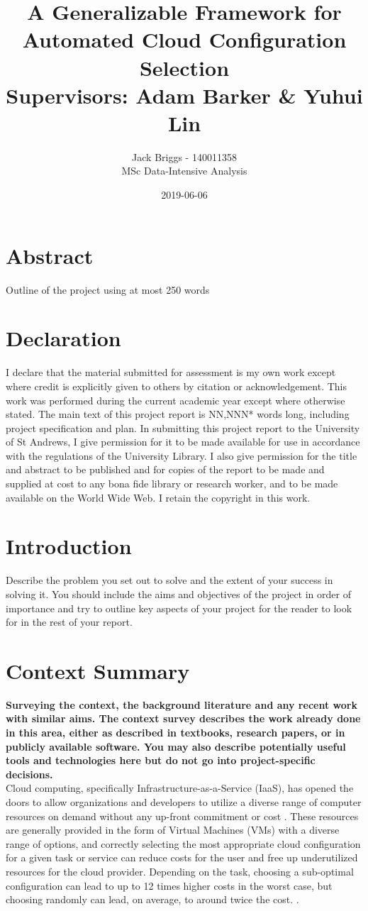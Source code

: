 \documentclass{article}
\title{\vspace{-2.0cm} A Generalizable Framework for Automated Cloud Configuration Selection \\ \vspace{0.5cm} \large Supervisors: Adam Barker \& Yuhui Lin}
\date{2019-06-06}
\author{Jack Briggs - 140011358 \\ MSc Data-Intensive Analysis}
\begin{document}
\maketitle
\newpage
\section*{Abstract}
Outline of the project using at most 250 words
\newpage
\section*{Declaration}
I declare that the material submitted for assessment
is my own work except where credit is explicitly
given to others by citation or acknowledgement. This
work was performed during the current academic year
except where otherwise stated.
The main text of this project report is NN,NNN* words
long, including project specification and plan.
In submitting this project report to the University of St
Andrews, I give permission for it to be made
available for use in accordance with the regulations of the University Library. I also give permission for the title and abstract to be published and for copies of the report to be made and supplied at cost to any bona fide library or research worker, and to be made available on the World Wide Web. I retain the copyright in this work.
\newpage
\tableofcontents
\listoffigures
\newpage
\section{Introduction}
Describe the problem you set out to solve and the extent
of your success in solving it. You should include the aims
and objectives of the project in order of importance and
try to outline key aspects of your project for the reader to look for in the rest of your report.
\section{Context Summary}
\textbf{Surveying the context, the background literature and any
recent work with similar aims. The context survey
describes the work already done in this area, either as
described in textbooks, research papers, or in publicly
available software. You may also describe potentially
useful tools and technologies here but do not go into
project-specific decisions.} \\
Cloud computing, specifically Infrastructure-as-a-Service (IaaS), has opened the doors to allow organizations and developers to utilize a diverse range of computer resources on demand without any up-front commitment or cost \cite{Armbrust2009}. These resources are generally provided in the form of Virtual Machines (VMs) with a diverse range of options, and correctly selecting the most appropriate cloud configuration for a given task or service can reduce costs for the user and free up underutilized resources for the cloud provider. Depending on the task, choosing a sub-optimal configuration can lead to up to 12 times higher costs in the worst case, but choosing randomly can lead, on average, to around twice the cost. \cite{Alipourfard2017}.
\bigskip
\end{document}
